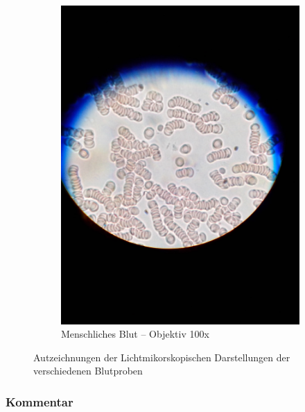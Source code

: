 \begin{figure}[h!]
\begin{subfigure}[b]{0.3\textwidth}
		\includegraphics[width=1\textwidth]{../images/02_own_blood.jpg}
		\caption{Menschliches Blut -- Objektiv 100x}
	\end{subfigure}
	\caption{Autzeichnungen der Lichtmikorskopischen Darstellungen der
		verschiedenen Blutproben}
\end{figure}

\subsubsection{Kommentar}
